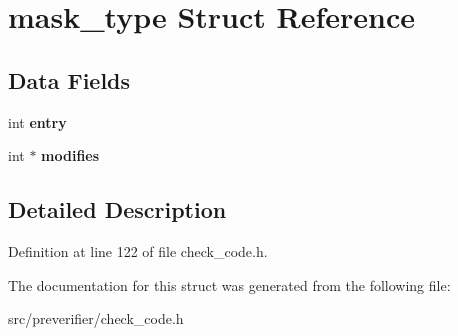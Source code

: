 \section{mask\_\-type Struct Reference}
\label{structmask__type}
\subsection*{Data Fields}
\begin{DoxyCompactItemize}
\item 
int {\bfseries entry}\label{structmask__type_ad260729968c485439adc21cb14307110}

\item 
int $\ast$ {\bfseries modifies}\label{structmask__type_a6ac74be2ddea960c9b31ad0ce857854d}

\end{DoxyCompactItemize}


\subsection{Detailed Description}


Definition at line 122 of file check\_\-code.h.



The documentation for this struct was generated from the following file:\begin{DoxyCompactItemize}
\item 
src/preverifier/check\_\-code.h\end{DoxyCompactItemize}
